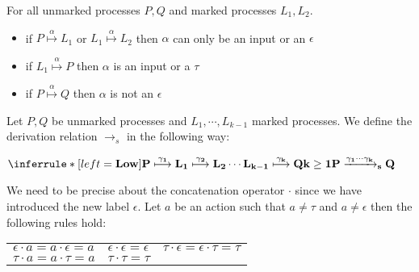 \begin{lemma}\label{multiinpconstraintswithmarked}
  For all unmarked processes $P,Q$ and marked processes $L_{1}, L_{2}$.
  \begin{itemize}
    \item
      if $P\stackrel{\alpha}{\longmapsto}L_{1}$ or $L_{1}\stackrel{\alpha}{\longmapsto}L_{2}$ then $\alpha$ can only be an input or an $\epsilon$
    \item
      if $L_{1}\stackrel{\alpha}{\longmapsto}P$ then $\alpha$ is an input or a $\tau$
    \item
      if $P\stackrel{\alpha}{\longmapsto}Q$ then $\alpha$ is not an $\epsilon$
  \end{itemize}
\end{lemma}


  
\begin{definition}\label{low}
  Let $P, Q$ be unmarked processes and $L_{1}, \cdots, L_{k-1}$ marked processes. We define the derivation relation $\rightarrow_{s}$ in the following way:
  \begin{center}
    $\inferrule* [left=\bf{Low}]{
	P \stackrel{\gamma_{1}}{\longmapsto} L_{1} \stackrel{\gamma_{2}}{\longmapsto} L_{2} \cdots L_{k-1} \stackrel{\gamma_{k}}{\longmapsto} Q
      \\
	k\geq 1
    }{
      P \xrightarrow{\gamma_{1} \cdots \gamma_{k}}_{s}  Q
    }$
  \end{center}
  We need to be precise about the concatenation operator $\cdot$ since we have introduced the new label $\epsilon$. Let $a$ be an action such that $a\neq \tau$ and $a\neq \epsilon$ then the following rules hold:
  \begin{center}
      \begin{tabular}{lll}
	  $\epsilon \cdot a = a \cdot \epsilon = a$
	&
	  $\epsilon \cdot \epsilon = \epsilon$
	&
	  $\tau \cdot \epsilon = \epsilon \cdot \tau = \tau$
	\\
	  $\tau \cdot a = a \cdot \tau = a$
	&
	  $\tau \cdot \tau = \tau$
	&
      \end{tabular}
  \end{center}
\end{definition}

